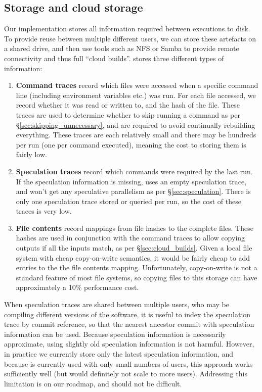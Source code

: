 \subsection{Storage and cloud storage}
\label{sec:cloud_implementation}

Our \Rattle implementation stores all information required between executions to disk. To provide reuse between multiple different users, we can store these artefacts on a shared drive, and then use tools such as NFS or Samba to provide remote connectivity and thus full ``cloud builds''. \Rattle stores three different types of information:

\begin{enumerate}
\item \textbf{Command traces} record which files were accessed when a specific command line (including environment variables etc.) was run. For each file accessed, we record whether it was read or written to, and the hash of the file. These traces are used to determine whether to skip running a command as per \S\ref{sec:skipping_unnecessary}, and are required to avoid continually rebuilding everything. These traces are each relatively small and there may be hundreds per run (one per command executed), meaning the cost to storing them is fairly low.
\item \textbf{Speculation traces} record which commands were required by the last run. If the speculation information is missing, \Rattle uses an empty speculation trace, and won't get any speculative parallelism as per \S\ref{sec:speculation}. There is only one speculation trace stored or queried per run, so the cost of these traces is very low.
\item \textbf{File contents} record mappings from file hashes to the complete files. These hashes are used in conjunction with the command traces to allow copying outputs if all the inputs match, as per \S\ref{sec:cloud_builds}. Given a local file system with cheap copy-on-write semantics, it would be fairly cheap to add entries to the the file contents mapping. Unfortunately, copy-on-write is not a standard feature of most file systems, so copying files to this storage can have approximately a 10\% performance cost.
\end{enumerate}

When speculation traces are shared between multiple users, who may be compiling different versions of the software, it is useful to index the speculation trace by commit reference, so that the nearest ancestor commit with speculation information can be used. Because speculation information is necessarily approximate, using slightly old speculation information is not harmful. However, in practice we currently store only the latest speculation information, and because \Rattle is currently used with only small numbers of users, this approach works sufficiently well (but would definitely not scale to more users). Addressing this limitation is on our roadmap, and should not be difficult.

